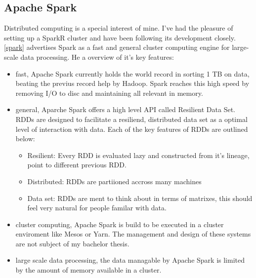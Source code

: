 \documentclass{article}
\begin{document}
    \subsection{Apache Spark}
    Distributed computing is a special interest of mine. I've had the pleasure of setting up a SparkR cluster and have been following its development closely. \ref{spark} advertises Spark as a fast and general cluster computing engine for large-scale data processing. He a overview of it's key features:
    \begin{itemize}
        \item fast, Apache Spark currently holds the world record in sorting 1 TB on data, beating the previus record help by Hadoop. Spark reaches this high speed by removing I/O to disc and maintaining all relevant in memory.
        \item general, Aparche Spark offers a high level API called Resilient Data Set. RDDs are designed to facilitate a resiliend, distributed data set as a optimal level of interaction with data. Each of the key features of RDDs are outlined below:
        \begin{itemize}
            \item Resilient: Every RDD is evaluated lazy and constructed from it's lineage, point to different previous RDD.
            \item Distributed: RDDs are partiioned accross many machines
            \item Data set: RDDs are ment to think about in terms of matrixes, this should feel very natural for people familar with data.
        \end{itemize}
        \item cluster computing, Apache Spark is build to be executed in a cluster enviroment like Mesos or Yarn. The management and design of these systems are not subject of my bachelor thesis.
        \item large scale data processing, the data managable by Apache Spark is limited by the amount of memory available in a cluster.

    \end{itemize}
\end{document}
